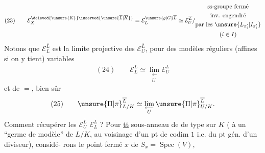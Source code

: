 \[
(23)\qquad
\mathcal E_X^{\deleted{\unsure{K}}\inserted{\unsure{\overline L|\overline K}}}
=\mathcal E_L^{\unsure{g|G}\overline L}
\simeq\mathcal E_U^{\overline L}/\begin{gathered}\text{ss-groupe fermé}\\\text{inv. engendré}\\\text{par les }\unsure{L_{x_i'}|I_{x_i'}}\\(i\in I)\end{gathered}
\]
Notons que $\mathcal E_L^{\overline L}$ est la limite
projective des $\mathcal E_U^{\overline L}$, pour des
modèles réguliers (affines si on y tient)
variables
\[
(24)\qquad\mathcal E_L^{\overline L}\simeq\lim_{\substack{\longleftarrow\\U}}\mathcal E_U^{\overline L}
\]
et de $=$, bien sûr
\[
(25)\qquad\unsure{\Pi|\pi}_{L/K}^{\overline L}\simeq\lim_{\substack{\longleftarrow\\U}}\unsure{\Pi|\pi}_{U/K}^{\overline L}.
\]
Comment récupérer les $\mathcal E_U^{\overline L}$ 
$\mathcal E_L^{\overline L}$ ? Pour \uline{tt}
sous-anneau  de  de type
 sur $K$ ( à un
``germe de modèle'' de $L/K$, au
voisinage d'un pt de codim $1$ i.e.
du pt gén. d'un diviseur), considé-\newline
rons le point fermé $x$ de $S_x=\operatorname{Spec}(V)$,

\margin{Dans les\newline
considérations qui\newline
suivent, $K$ (et $X,U$)\newline
ne jouent provisoirement\newline
aucun rôle --- \unsure{(|[}Mais on pourrait\newline
``plus gén.'' \unsure{regarder|remplacer} groupes de décomp.\newline
\deleted{\unsure{de dimension relative}} d'un des ``$U$''\newline
\uline{mais seulement} \uline{\unsure{épis-comp|épi-s-comp|épi-scop}} (la ``généralisation'' étant\newline
triviale,\newline
$\mathcal E_L\longrightarrow\mathcal E_U$)}


